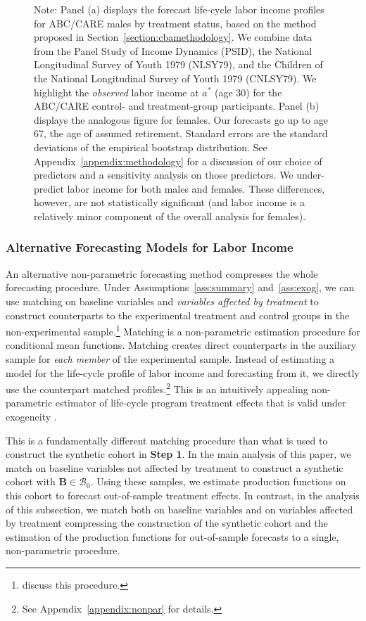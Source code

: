 \begin{figure}
Note: Panel (a) displays the forecast life-cycle labor income profiles for ABC/CARE males by treatment status, based on the method proposed in Section~\ref{section:cbamethodology}. We combine data from the Panel Study of Income Dynamics (PSID), the National Longitudinal Survey of Youth 1979 (NLSY79), and the Children of the National Longitudinal Survey of Youth 1979 (CNLSY79). We highlight the \textit{observed} labor income at $a^*$ (age 30) for the ABC/CARE control- and treatment-group participants. Panel (b) displays the analogous figure for females. Our forecasts go up to age 67, the age of assumed retirement. Standard errors are the standard deviations of the empirical bootstrap distribution. See  Appendix~\ref{appendix:methodology} for a discussion of our choice of predictors and a sensitivity analysis on those predictors. We under-predict labor income for both males and females. These differences, however, are not statistically significant (and labor income is a relatively minor component of the overall analysis for females).
\end{figure}

\subsubsection{Alternative Forecasting Models for Labor Income} \label{section:sens}

\noindent An alternative non-parametric forecasting method compresses the whole forecasting procedure. Under Assumptions~\ref{ass:summary} and~\ref{ass:exog}, we can use matching on baseline variables and \emph{variables affected by treatment} to construct counterparts to the experimental treatment and control groups in the non-experimental sample.\footnote{\citet{Heckman_Ichimura_etal_1998_Econometrica} discuss this procedure.} Matching is a non-parametric estimation procedure for conditional mean functions. Matching creates direct counterparts in the auxiliary sample for \textit{each member} of the experimental sample. Instead of estimating a model for the life-cycle profile of labor income and forecasting from it, we directly use the counterpart matched profiles.\footnote{See Appendix~\ref{appendix:nonpar} for details.} This is an intuitively appealing non-parametric estimator of life-cycle program treatment effects that is valid under exogeneity \citep{Heckman_Navarro_2004_REStat}.

This is a fundamentally different matching procedure than what is used to construct the synthetic cohort in \textbf{Step 1}. In the main analysis of this paper, we match on baseline variables not affected by treatment to construct a synthetic cohort with $\bm{B} \in \mathcal{B}_0$. Using these samples, we estimate production functions on this cohort to forecast out-of-sample treatment effects. In contrast, in the analysis of this subsection, we match both on baseline variables and on variables affected by treatment compressing the construction of the synthetic cohort and the estimation of the production functions for out-of-sample forecasts to a single, non-parametric procedure.

